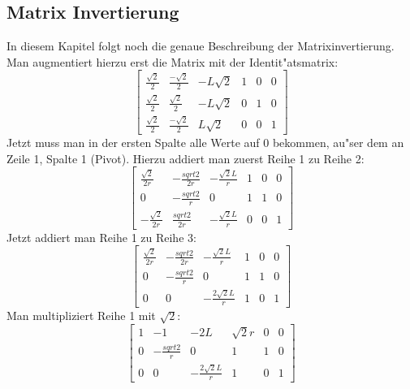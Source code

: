 \documentclass[11pt]{article}
\begin{document}
    \subsection{Matrix Invertierung}\label{subsec:matrxinv}
    In diesem Kapitel folgt noch die genaue Beschreibung der Matrixinvertierung.
    Man augmentiert hierzu erst die Matrix mit der Identit"atsmatrix:
    \begin{equation}
        \left[\begin{array}{ccc|ccc}
                  \frac{\sqrt{2}}{2} & \frac{-\sqrt{2}}{2} & -L\sqrt{2} & 1 & 0 & 0 \\
                  \frac{\sqrt{2}}{2} & \frac{\sqrt{2}}{2} & -L\sqrt{2} & 0 & 1 & 0\\
                  \frac{\sqrt{2}}{2} & \frac{-\sqrt{2}}{2} & L\sqrt{2} & 0 & 0 & 1
        \end{array}\right]\label{eq:startinv}
    \end{equation}
    Jetzt muss man in der ersten Spalte alle Werte auf 0 bekommen, au"ser dem an Zeile 1, Spalte 1 (Pivot).
    Hierzu addiert man zuerst Reihe 1 zu Reihe 2:
    \begin{equation}
        \left[\begin{array}{ccc|ccc}
                  \frac{\sqrt{2}}{2r}  & -\frac{sqrt{2}}{2r} & -\frac{\sqrt{2}L}{r} & 1 & 0 & 0 \\
                  0                    & -\frac{sqrt{2}}{r}  & 0                    & 1 & 1 & 0 \\
                  -\frac{\sqrt{2}}{2r} & \frac{sqrt{2}}{2r}  & -\frac{\sqrt{2}L}{r} & 0 & 0 & 1
        \end{array}\right]\label{eq:equationr1addr3}
    \end{equation}
    Jetzt addiert man Reihe 1 zu Reihe 3:
    \begin{equation}
        \left[\begin{array}{ccc|ccc}
                  \frac{\sqrt{2}}{2r} & -\frac{sqrt{2}}{2r} & -\frac{\sqrt{2}L}{r}  & 1 & 0 & 0 \\
                  0                   & -\frac{sqrt{2}}{r}  & 0                     & 1 & 1 & 0 \\
                  0                   & 0                   & -\frac{2\sqrt{2}L}{r} & 1 & 0 & 1
        \end{array}\right]\label{eq:invr3tor1}
    \end{equation}
    Man multipliziert Reihe 1 mit $\sqrt{2}$:
    \begin{equation}
        \left[\begin{array}{ccc|ccc}
                  1 & -1                 & -2L                   & \sqrt{2}r & 0 & 0 \\
                  0 & -\frac{sqrt{2}}{r} & 0                     & 1         & 1 & 0 \\
                  0 & 0                  & -\frac{2\sqrt{2}L}{r} & 1         & 0 & 1
        \end{array}\right]\label{eq:invsqrtmult}
    \end{equation}
\end{document}

